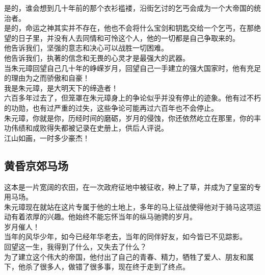 \begin{multicols}{\theparacolNo}
是的，谁会想到几十年前的那个衣衫褴褛，沿街乞讨的乞丐会成为一个大帝国的统治者。\\

是的，命运之神其实并不存在，他也不会将什么宝剑和钥匙交给一个乞丐，在那绝望的日子里，并没有人去同情和可怜这个人，他的一切都是自己争取来的。\\

他告诉我们，坚强的意志和决心可以战胜一切困难。\\

他告诉我们，执著的信念和无畏的心灵才是最强大的武器。\\

当朱元璋回望自己几十年的峥嵘岁月，回望自己一手建立的强大国家时，他有充足的理由为之而骄傲和自豪！\\

我是朱元璋，是大明天下的缔造者！\\

六百多年过去了，但笼罩在朱元璋身上的争论似乎并没有停止的迹象。他有过不朽的功勋，也有过严重的过失，这些争论可能再过六百年也不会停止。\\

朱元璋，你就是你，历经时间的磨砺，岁月的侵蚀，你还依然屹立在那里，你的丰功伟绩和成败得失都被记录在史册上，供后人评说。\\

江山如画，一时多少豪杰！\\

\subsection{黄昏京郊马场}
这本是一片宽阔的农田，在一次政府征地中被征收，种上了草，并成为了皇室的专用马场。\\

朱元璋现在就站在这片专属于他的土地上，多年的马上征战使得他对于骑马这项运动有着浓厚的兴趣。他始终不能忘怀当年的纵马驰骋的岁月。\\

岁月催人！\\

当年的风华少年，如今已经年华老去，当年的同伴好友，如今皆已不见踪影。\\

回望这一生，我得到了什么，又失去了什么？\\

为了建立这个伟大的帝国，他付出了自己的青春、精力，牺牲了爱人、朋友和属下，他杀了很多人，做错了很多事，现在终于走到了终点。\\


\end{multicols}
